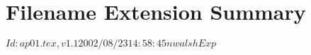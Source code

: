 \chapter{Filename Extension Summary} 
\RCSID$Id: ap01.tex,v 1.1 2002/08/23 14:58:45 nwalsh Exp $
\label{chap:fileext}

\def\extitem[#1]{%
  {\fontsize{11}{13pt}\selectfont%
  \ipitem [ \textit{\textbf{\uppercase{#1}}} ]
  }
}

\ifincludechapter\else\endinput\fi

This chapter summarizes many common filename extensions.  The extensions
are listed in alphabetical order.  All extensions can be shortened
to three letters for consistency with operating systems that do not allow
longer file extensions.  On other file systems, they may be slightly 
different.  For example, \ext{EPS} files are sometimes called 
\ext{EPSF} files on \Unix\ systems, which allow longer filenames.

